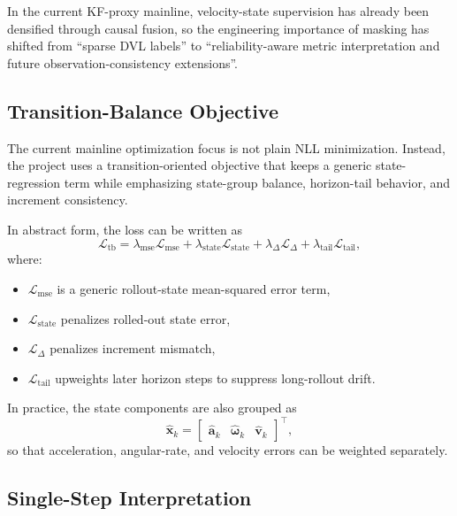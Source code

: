 In the current KF-proxy mainline, velocity-state supervision has already been densified through causal fusion, so the engineering importance of masking has shifted from ``sparse DVL labels'' to ``reliability-aware metric interpretation and future observation-consistency extensions''.

\subsection{Transition-Balance Objective}

The current mainline optimization focus is not plain NLL minimization.
Instead, the project uses a transition-oriented objective that keeps a generic state-regression term while emphasizing state-group balance, horizon-tail behavior, and increment consistency.

In abstract form, the loss can be written as
\begin{equation}
\mathcal{L}_{\mathrm{tb}}
=
\lambda_{\mathrm{mse}}\mathcal{L}_{\mathrm{mse}}
+
\lambda_{\mathrm{state}}\mathcal{L}_{\mathrm{state}}
+
\lambda_{\Delta}\mathcal{L}_{\Delta}
+
\lambda_{\mathrm{tail}}\mathcal{L}_{\mathrm{tail}},
\end{equation}
where:
\begin{itemize}
  \item $\mathcal{L}_{\mathrm{mse}}$ is a generic rollout-state mean-squared error term,
  \item $\mathcal{L}_{\mathrm{state}}$ penalizes rolled-out state error,
  \item $\mathcal{L}_{\Delta}$ penalizes increment mismatch,
  \item $\mathcal{L}_{\mathrm{tail}}$ upweights later horizon steps to suppress long-rollout drift.
\end{itemize}

In practice, the state components are also grouped as
\begin{equation}
\hat{\mathbf{x}}_k =
\begin{bmatrix}
\hat{\mathbf{a}}_k &
\hat{\boldsymbol{\omega}}_k &
\hat{\mathbf{v}}_k
\end{bmatrix}^{\top},
\end{equation}
so that acceleration, angular-rate, and velocity errors can be weighted separately.

\subsection{Single-Step Interpretation}


